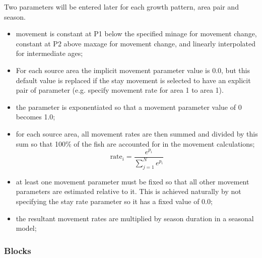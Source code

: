 Two parameters will be entered later for each growth pattern, area pair and season.   
\begin{itemize}
	\item movement is constant at P1 below the specified minage for movement change, constant at P2 above maxage for movement change, and linearly interpolated for intermediate ages;
	\item For each source area the implicit movement parameter value is 0.0, but this default value is replaced if the stay movement is selected to have an explicit pair of parameter (e.g. specify movement rate for area 1 to area 1).
	\item the parameter is exponentiated so that a movement parameter value of 0 becomes 1.0;
	\item for each source area, all movement rates are then summed and divided by this sum so that 100\% of the fish are accounted for in the movement calculations;
	\begin{equation}
	\text{rate}_i = \frac{e^{p_i}}{\sum_{j=1}^{N}e^{p_i}}
	\end{equation}
	\item at least one movement parameter must be fixed so that all other movement parameters are estimated relative to it.  This is achieved naturally by not specifying the stay rate parameter so it has a fixed value of 0.0;
	\item the resultant movement rates are multiplied by season duration in a seasonal model;
	
\end{itemize}

\pagebreak
\subsubsection{Blocks}
	
